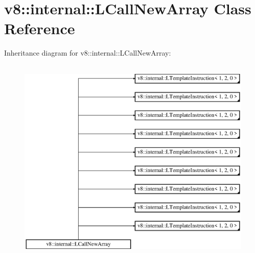 \hypertarget{classv8_1_1internal_1_1_l_call_new_array}{}\section{v8\+:\+:internal\+:\+:L\+Call\+New\+Array Class Reference}
\label{classv8_1_1internal_1_1_l_call_new_array}
Inheritance diagram for v8\+:\+:internal\+:\+:L\+Call\+New\+Array\+:\begin{figure}[H]
\begin{center}
\leavevmode
\includegraphics[height=10.000000cm]{classv8_1_1internal_1_1_l_call_new_array}
\end{center}
\end{figure}
